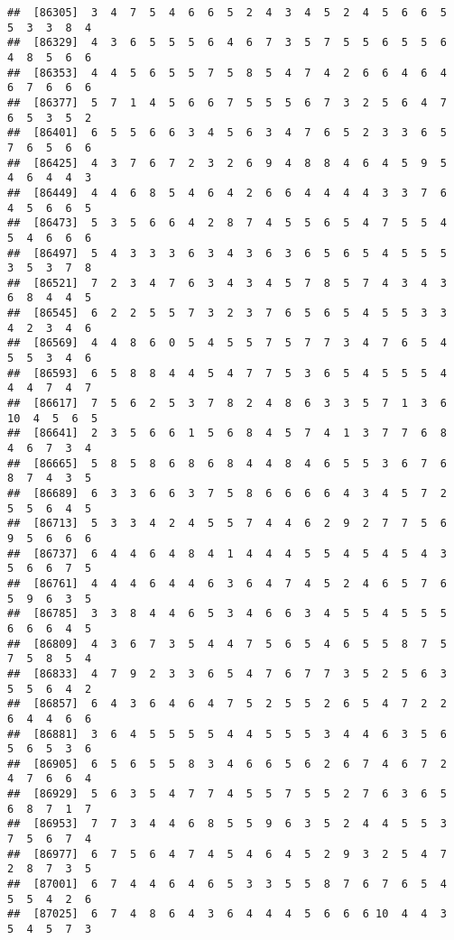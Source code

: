 \documentclass[
]{book}
\begin{document}
\begin{verbatim}
##  [86305]  3  4  7  5  4  6  6  5  2  4  3  4  5  2  4  5  6  6  5  5  3  3  8  4
##  [86329]  4  3  6  5  5  5  6  4  6  7  3  5  7  5  5  6  5  5  6  4  8  5  6  6
##  [86353]  4  4  5  6  5  5  7  5  8  5  4  7  4  2  6  6  4  6  4  6  7  6  6  6
##  [86377]  5  7  1  4  5  6  6  7  5  5  5  6  7  3  2  5  6  4  7  6  5  3  5  2
##  [86401]  6  5  5  6  6  3  4  5  6  3  4  7  6  5  2  3  3  6  5  7  6  5  6  6
##  [86425]  4  3  7  6  7  2  3  2  6  9  4  8  8  4  6  4  5  9  5  4  6  4  4  3
##  [86449]  4  4  6  8  5  4  6  4  2  6  6  4  4  4  4  3  3  7  6  4  5  6  6  5
##  [86473]  5  3  5  6  6  4  2  8  7  4  5  5  6  5  4  7  5  5  4  5  4  6  6  6
##  [86497]  5  4  3  3  3  6  3  4  3  6  3  6  5  6  5  4  5  5  5  3  5  3  7  8
##  [86521]  7  2  3  4  7  6  3  4  3  4  5  7  8  5  7  4  3  4  3  6  8  4  4  5
##  [86545]  6  2  2  5  5  7  3  2  3  7  6  5  6  5  4  5  5  3  3  4  2  3  4  6
##  [86569]  4  4  8  6  0  5  4  5  5  7  5  7  7  3  4  7  6  5  4  5  5  3  4  6
##  [86593]  6  5  8  8  4  4  5  4  7  7  5  3  6  5  4  5  5  5  4  4  4  7  4  7
##  [86617]  7  5  6  2  5  3  7  8  2  4  8  6  3  3  5  7  1  3  6 10  4  5  6  5
##  [86641]  2  3  5  6  6  1  5  6  8  4  5  7  4  1  3  7  7  6  8  4  6  7  3  4
##  [86665]  5  8  5  8  6  8  6  8  4  4  8  4  6  5  5  3  6  7  6  8  7  4  3  5
##  [86689]  6  3  3  6  6  3  7  5  8  6  6  6  6  4  3  4  5  7  2  5  5  6  4  5
##  [86713]  5  3  3  4  2  4  5  5  7  4  4  6  2  9  2  7  7  5  6  9  5  6  6  6
##  [86737]  6  4  4  6  4  8  4  1  4  4  4  5  5  4  5  4  5  4  3  5  6  6  7  5
##  [86761]  4  4  4  6  4  4  6  3  6  4  7  4  5  2  4  6  5  7  6  5  9  6  3  5
##  [86785]  3  3  8  4  4  6  5  3  4  6  6  3  4  5  5  4  5  5  5  6  6  6  4  5
##  [86809]  4  3  6  7  3  5  4  4  7  5  6  5  4  6  5  5  8  7  5  7  5  8  5  4
##  [86833]  4  7  9  2  3  3  6  5  4  7  6  7  7  3  5  2  5  6  3  5  5  6  4  2
##  [86857]  6  4  3  6  4  6  4  7  5  2  5  5  2  6  5  4  7  2  2  6  4  4  6  6
##  [86881]  3  6  4  5  5  5  5  4  4  5  5  5  3  4  4  6  3  5  6  5  6  5  3  6
##  [86905]  6  5  6  5  5  8  3  4  6  6  5  6  2  6  7  4  6  7  2  4  7  6  6  4
##  [86929]  5  6  3  5  4  7  7  4  5  5  7  5  5  2  7  6  3  6  5  6  8  7  1  7
##  [86953]  7  7  3  4  4  6  8  5  5  9  6  3  5  2  4  4  5  5  3  7  5  6  7  4
##  [86977]  6  7  5  6  4  7  4  5  4  6  4  5  2  9  3  2  5  4  7  2  8  7  3  5
##  [87001]  6  7  4  4  6  4  6  5  3  3  5  5  8  7  6  7  6  5  4  5  5  4  2  6
##  [87025]  6  7  4  8  6  4  3  6  4  4  4  5  6  6  6 10  4  4  3  5  4  5  7  3

\end{verbatim}
\end{document}
